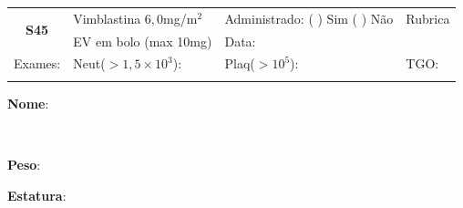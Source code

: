 \documentclass[11pt,a4paper,oldfontcommands]{memoir}
\def\entrywithlabel[#1]#2{\parbox{#1}{{\small #2:} \hrulefill}}
\begin{document}
\begin{center}
\begin{table}[H]
\begin{tabular}{p{}p{}|p{}|p{3cm}}
    \hline
    \\
    \hline
    \multicolumn{1}{c|}{\multirow{2}{*}{\textbf{S45}}}&{Vimblastina \(6,0\)mg/m\(^2\)}&{Administrado: (  ) Sim (  ) Não}&{Rubrica}\\
    \multicolumn{1}{c|}{}&{EV em bolo (max 10mg)}&{Data:}&\\
    \hline
    {Exames:}&{Neut(\(>1,5\times10^3\)):}&{Plaq(\(>10^5\)):}&{TGO:}
    \\
    \hline
    \\
\end{tabular}
\end{table}

\noindent
\entrywithlabel[1\hsize]{\textbf{Nome}}\hfill
\\[0.3cm]
\entrywithlabel[.45\hsize]{\textbf{Peso}}\hfill  \entrywithlabel[.45\hsize]{\textbf{Estatura}}


\begin{table}[H]
\begin{tabular}{p{}p{}|p{}|p{3cm}}


\end{tabular}
\end{table}
\end{center}
\end{document}
